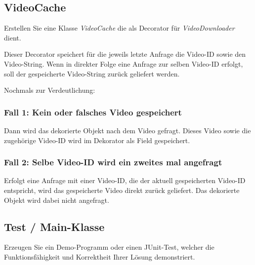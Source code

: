 \documentclass[oneside,a4paper]{scrartcl}
\begin{document}
\subsection{VideoCache}
Erstellen Sie eine Klasse \emph{VideoCache} die als Decorator für \emph{VideoDownloader} dient.

Dieser Decorator speichert für die jeweils letzte Anfrage die Video-ID sowie den Video-String.
Wenn in direkter Folge eine Anfrage zur selben Video-ID erfolgt, soll der gespeicherte Video-String zurück geliefert werden.

\newpage
\noindent
Nochmals zur Verdeutlichung:

\subsubsection{Fall 1: Kein oder falsches Video gespeichert}
Dann wird das dekorierte Objekt nach dem Video gefragt. Dieses Video sowie die zugehörige Video-ID wird im Dekorator
als Field gespeichert.

\subsubsection{Fall 2: Selbe Video-ID wird ein zweites mal angefragt}
Erfolgt eine Anfrage mit einer Video-ID, die der aktuell gespeicherten Video-ID entspricht,
wird das gespeicherte Video direkt zurück geliefert. Das dekorierte Objekt wird dabei nicht angefragt.


\subsection{Test / Main-Klasse}
Erzeugen Sie ein Demo-Programm oder einen JUnit-Test, welcher die Funktionsfähigkeit und Korrektheit Ihrer Lösung demonstriert.
\end{document}
